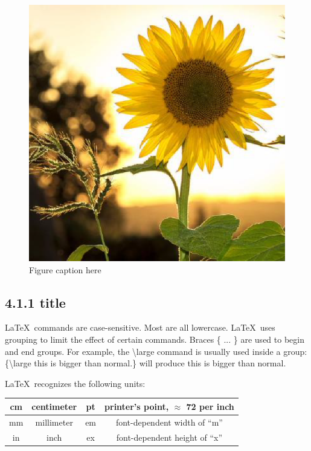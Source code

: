 \documentclass[12pt,openright]{book}
\begin{document}
\begin{figure}[!htbp]
  \centering
  \includegraphics[width=\textwidth]{flower}
  \caption{Figure caption here}
  \label{fig:29571453.jpg}
\end{figure}

\subsection{4.1.1 title}

\LaTeX\ commands are case-sensitive. Most are all lowercase. \LaTeX\ uses grouping to limit the effect of certain commands. Braces \{ ... \} are used to begin and end groups. For example, the
\textbackslash large command is usually used inside a group: \{\textbackslash large this is bigger than normal.\}  will produce {\large this is bigger than normal.} 

\LaTeX\ recognizes the following units:
\vskip 0.2in
\begin{tabular}{|c|c||c|c|}
  \hline 
  cm & centimeter & pt & printer’s point, $\approx$ 72 per inch \\ \hline
  mm & millimeter & em & font-dependent width of “m” \\ 	\hline
  in & inch & ex & font-dependent height of “x” \\ 	\hline
\end{tabular}
\vskip 0.2in
\end{document}
